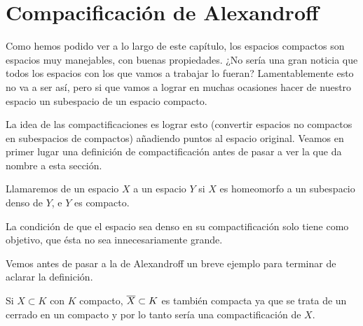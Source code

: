 \section{Compacificación de Alexandroff}

Como hemos podido ver a lo largo de este capítulo, los espacios compactos son espacios muy manejables, con buenas propiedades. ¿No sería una gran noticia que todos los espacios con los que vamos a trabajar lo fueran? Lamentablemente esto no va a ser así, pero si que vamos a lograr en muchas ocasiones hacer de nuestro espacio un subespacio de un espacio compacto.


La idea de las compactificaciones es lograr esto (convertir espacios no compactos en subespacios de compactos) añadiendo puntos al espacio original.
Veamos en primer lugar una definición de compactificación antes de pasar a ver la que da nombre a esta sección.

\begin{defi}[Compactificación]
	Llamaremos  de un espacio $X$ a un espacio $Y$ si $X$ es homeomorfo a un subespacio denso de $Y$, e $Y$ es compacto.
\end{defi}


La condición de que el espacio sea denso en su compactificación solo tiene como objetivo, que ésta no sea innecesariamente grande. 


Vemos antes de pasar a la de Alexandroff un breve ejemplo para terminar de aclarar la definición.
\begin{exa}
	Si $X\subset K$ con $K$ compacto, $\overline{X}\subset K$ es también compacta ya que se trata de un cerrado en un compacto y por lo tanto sería una compactificación de $X$.
\end{exa}

